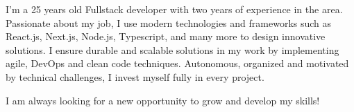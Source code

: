 
\begin{cvparagraph}
    I'm a 25 years old Fullstack developer with two years of experience in the area. Passionate about my job, I use modern technologies and frameworks such as React.js, Next.js, Node.js, Typescript, and many more to design innovative solutions. I ensure durable and scalable solutions in my work by implementing agile, DevOps and clean code techniques. Autonomous, organized and motivated by technical challenges, I invest myself fully in every project.
    
    I am always looking for a new opportunity to grow and develop my skills!
\end{cvparagraph}
